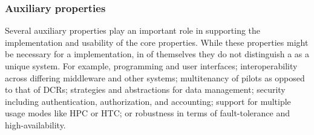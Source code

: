 \documentclass{sig-alternate}
\begin{document}
\subsubsection{Auxiliary properties}
\label{sec:auxprops}

Several auxiliary properties play an important role in supporting the
implementation and usability of the core properties. While these properties
might be necessary for a \pilot implementation, in of themselves they do not
distinguish a \pilot as a unique system. For example, programming and user
interfaces; interoperability across differing middleware and other \pilot
systems; multitenancy of pilots as opposed to that of DCRs; strategies and
abstractions for data management; security including authentication,
authorization, and accounting; support for multiple usage modes like HPC or HTC;
or robustness in terms of fault-tolerance and high-availability.



\end{document}
